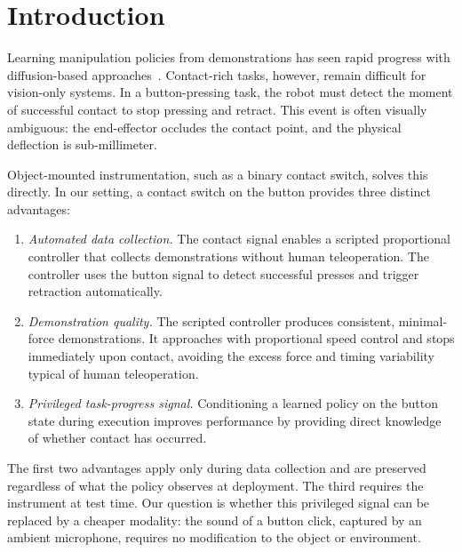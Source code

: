 \documentclass[conference]{IEEEtran}
\begin{document}
\section{Introduction}

Learning manipulation policies from demonstrations has seen rapid progress with diffusion-based approaches~\cite{chi2023diffusion}.
Contact-rich tasks, however, remain difficult for vision-only systems.
In a button-pressing task, the robot must detect the moment of successful contact to stop pressing and retract.
This event is often visually ambiguous: the end-effector occludes the contact point, and the physical deflection is sub-millimeter.

Object-mounted instrumentation, such as a binary contact switch, solves this directly.
In our setting, a contact switch on the button provides three distinct advantages:
\begin{enumerate}
    \item \emph{Automated data collection.}
    The contact signal enables a scripted proportional controller that collects demonstrations without human teleoperation.
    The controller uses the button signal to detect successful presses and trigger retraction automatically.
    \item \emph{Demonstration quality.}
    The scripted controller produces consistent, minimal-force demonstrations.
    It approaches with proportional speed control and stops immediately upon contact, avoiding the excess force and timing variability typical of human teleoperation.
    \item \emph{Privileged task-progress signal.}
    Conditioning a learned policy on the button state during execution improves performance by providing direct knowledge of whether contact has occurred.
\end{enumerate}

The first two advantages apply only during data collection and are preserved regardless of what the policy observes at deployment.
The third requires the instrument at test time.
Our question is whether this privileged signal can be replaced by a cheaper modality: the sound of a button click, captured by an ambient microphone, requires no modification to the object or environment.
\end{document}
